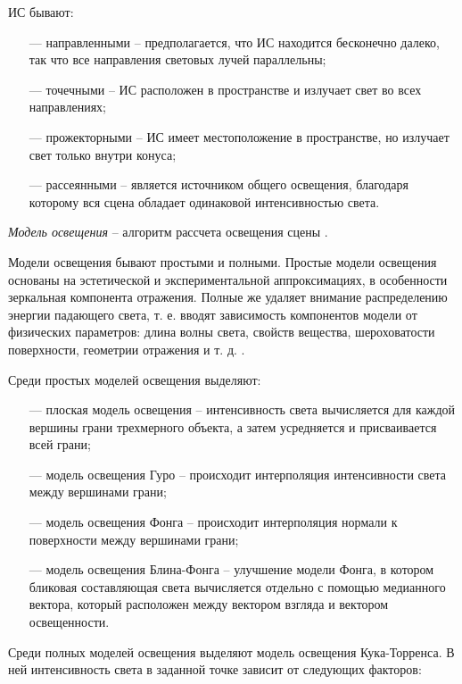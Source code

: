 ИС бывают:

\begin{itemize}
	\item[---] направленными -- предполагается, что ИС находится бесконечно далеко, так что все направления световых лучей параллельны;
	\item[---] точечными -- ИС расположен в пространстве и излучает свет во всех направлениях;
	\item[---] прожекторными -- ИС имеет местоположение в пространстве, но излучает свет только внутри конуса;
	\item[---] рассеянными -- является источником общего освещения, благодаря которому вся сцена обладает одинаковой интенсивностью света.
\end{itemize}

\textit{Модель освещения} -- алгоритм рассчета освещения сцены \cite{eberly20063d}. 

Модели освещения бывают простыми и полными. Простые модели освещения основаны на эстетической и экспериментальной аппроксимациях, в особенности зеркальная компонента отражения. Полные же удаляет внимание распределению энергии падающего света, т. е. вводят зависимость компонентов модели от физических параметров: длина волны света, свойств вещества, шероховатости поверхности, геометрии отражения и т. д. \cite{rogers}.

Среди простых моделей освещения выделяют:

\begin{itemize}
	\item[---] плоская модель освещения -- интенсивность света вычисляется для каждой вершины грани трехмерного объекта, а затем усредняется и присваивается всей грани;
	\item[---] модель освещения Гуро -- происходит интерполяция интенсивности света между вершинами грани;
	\item[---] модель освещения Фонга -- происходит интерполяция нормали к поверхности между вершинами грани;
	\item[---] модель освещения Блина-Фонга -- улучшение модели Фонга, в котором бликовая составляющая света вычисляется отдельно с помощью медианного вектора, который расположен между вектором взгляда и вектором освещенности.
\end{itemize}

Среди полных моделей освещения выделяют модель освещения Кука-Торренса. В ней интенсивность света в заданной точке зависит от следующих факторов:

